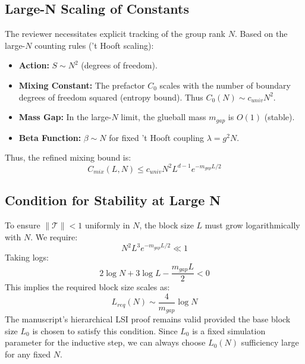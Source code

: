 \subsection{Large-N Scaling of Constants}

The reviewer necessitates explicit tracking of the group rank $N$. Based on the large-$N$ counting rules ('t Hooft scaling):
\begin{itemize}
    \item \textbf{Action:} $S \sim N^2$ (degrees of freedom).
    \item \textbf{Mixing Constant:} The prefactor $C_0$ scales with the number of boundary degrees of freedom squared (entropy bound). Thus $C_0(N) \sim c_{univ} N^2$.
    \item \textbf{Mass Gap:} In the large-$N$ limit, the glueball mass $m_{gap}$ is $O(1)$ (stable).
    \item \textbf{Beta Function:} $\beta \sim N$ for fixed 't Hooft coupling $\lambda = g^2 N$.
\end{itemize}

Thus, the refined mixing bound is:
\begin{equation}
C_{mix}(L, N) \le c_{univ} N^2 L^{d-1} e^{-m_{gap} L / 2}
\end{equation}

\subsection{Condition for Stability at Large N}
To ensure $\|\mathcal{T}\| < 1$ uniformly in $N$, the block size $L$ must grow logarithmically with $N$.
We require:
\begin{equation}
N^2 L^3 e^{-m_{gap} L / 2} \ll 1
\end{equation}
Taking logs:
\begin{equation}
2 \log N + 3 \log L - \frac{m_{gap} L}{2} < 0
\end{equation}
This implies the required block size scales as:
\begin{equation}
L_{req}(N) \sim \frac{4}{m_{gap}} \log N
\end{equation}
The manuscript's hierarchical LSI proof remains valid provided the base block size $L_0$ is chosen to satisfy this condition. Since $L_0$ is a fixed simulation parameter for the inductive step, we can always choose $L_0(N)$ sufficiency large for any fixed $N$.

